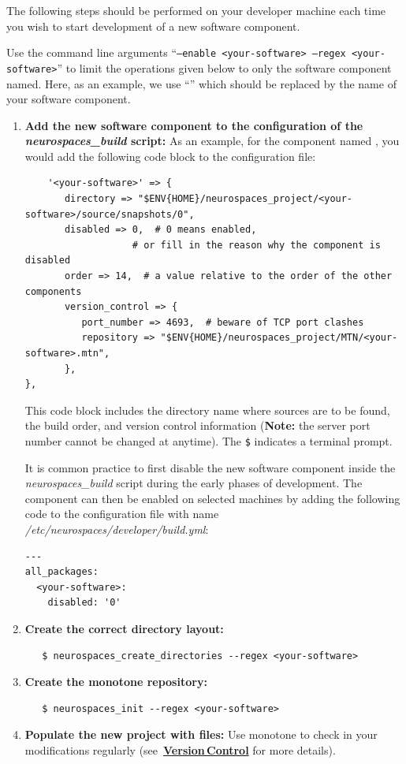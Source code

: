 \documentclass[12pt]{article}
\begin{document}
The following steps should be performed on your developer machine each time you wish to start development of a new software component.

Use the command line arguments ``{\tt --enable <your-software> --regex <your-software>}'' to limit the operations given below to only the software component named. Here, as an example, we use ``{\tt <your-software>}'' which should be replaced by the name of your software component. 

\begin{enumerate}
\item {\bf Add the new software component to the configuration of the {\it neurospaces\_build} script:} As an example, for the component named {\tt <your-software>}, you would add the following code block to the configuration file:
\begin{verbatim}
	'<your-software>' => {
	   directory => "$ENV{HOME}/neurospaces_project/<your-software>/source/snapshots/0",
	   disabled => 0,  # 0 means enabled,
                   # or fill in the reason why the component is disabled
	   order => 14,  # a value relative to the order of the other components
	   version_control => {
	      port_number => 4693,  # beware of TCP port clashes
	      repository => "$ENV{HOME}/neurospaces_project/MTN/<your-software>.mtn",
	   },
},
\end{verbatim}
  This code block includes the directory name where sources are to be
  found, the build order, and version control information ({\bf Note:}
  the server port number cannot be changed at anytime). The {\tt \$} indicates a terminal prompt.

  It is common practice to first disable the new software component
  inside the {\it neurospaces\_build} script during the early phases
  of development.  The component can then be enabled on selected
  machines by adding the following code to the configuration file with
  name {\it /etc/neurospaces/developer/build.yml}:

\begin{verbatim}
---
all_packages:
  <your-software>:
    disabled: '0'
\end{verbatim}



\item {\bf Create the correct directory layout:}
\begin{verbatim}
   $ neurospaces_create_directories --regex <your-software>
\end{verbatim}
  
\item {\bf Create the monotone repository:}
\begin{verbatim}
   $ neurospaces_init --regex <your-software>
\end{verbatim}

\item {\bf Populate the new project with files:} Use monotone to check in your modifications regularly (see~\href{../version-control/version-control.tex}{\bf Version\,Control} for more details).

\end{enumerate}
\end{document}
